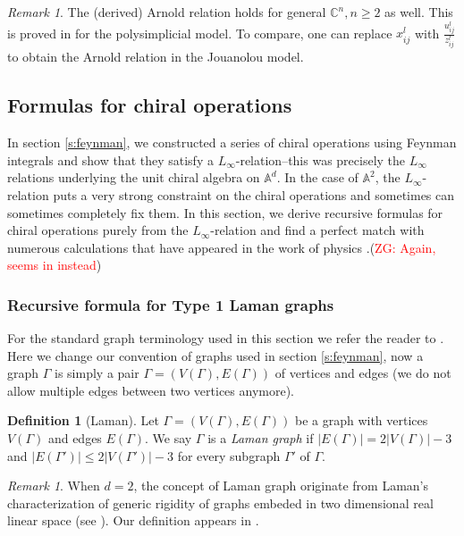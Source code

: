 \documentclass[11pt]{amsart}
\theoremstyle{definition}
\newtheorem{defn}[thm]{Definition}
\theoremstyle{remark}
\newtheorem{rem}[thm]{Remark}
\numberwithin{equation}{section}
\newcommand{\Gui}[1]{(\textcolor{red}{ZG: #1})}
\begin{document}
\begin{rem}
  The (derived) Arnold relation holds for general $\mathbb{C}^n,n\geq 2$ as well. This is proved in \cite{FGY} for the polysimplicial model.
  To compare, one can replace $x^l_{ij}$ with $\frac{u^l_{ij}}{z^l_{ij}}$ to obtain the Arnold relation in the Jouanolou model.
\end{rem}

\subsection{Formulas for chiral operations}


In section \ref{s:feynman}, we constructed a series of chiral operations using Feynman integrals and show that they satisfy a
$L_{\infty}$-relation--this was precisely the $L_\infty$ relations underlying the unit chiral algebra on $\mathbb{A}
^d$.
In the case of $\mathbb{A}^2$, the $L_{\infty}$-relation puts a very strong constraint on the chiral
operations and sometimes can sometimes completely fix them. In this section, we derive recursive formulas for chiral
operations purely from the $L_{\infty}$-relation and find a perfect match with numerous calculations that have appeared
in the work of physics
\cite{Gaiotto:2024gii}.\Gui{Again, seems in \cite{budzik2023feynman} instead}
\subsubsection{Recursive formula for Type 1 Laman graphs}
For the standard graph terminology used in this section we refer the reader to \cite{graver1993combinatorial}. Here we change our convention of graphs used in section \ref{s:feynman}, now a graph $\Gamma$ is simply a pair $\Gamma=(V(\Gamma),E(\Gamma))$ of vertices and edges (we do not allow multiple edges between two vertices anymore).


\begin{defn}[Laman]
Let $\Gamma=\left(V(\Gamma),E(\Gamma)\right)$ be a graph with vertices $V(\Gamma)$ and edges $E(\Gamma)$.
We say $\Gamma$ is a \textit{Laman graph} if $|E(\Gamma)|=2|V(\Gamma)|-3$ and $|E(\Gamma')|\leq 2|V(\Gamma')| -3$ for every subgraph $\Gamma'$ of $\Gamma$.
\end{defn}

\begin{rem}
  When $d = 2$, the concept of Laman graph originate from Laman's
  characterization of generic rigidity of graphs embeded in two dimensional
  real linear space (see {\cite{Laman1970OnGA}}). Our definition appears in
  {\cite{budzik2023feynman}}.
\end{rem}
\end{document}
